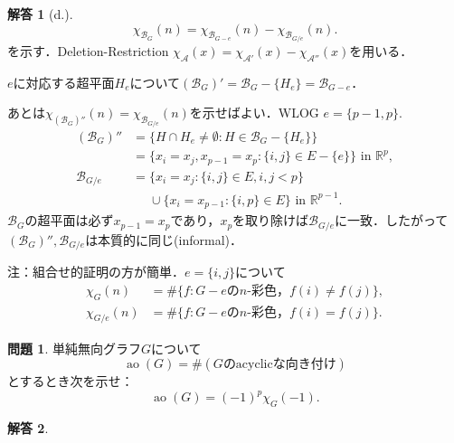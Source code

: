 \documentclass[xelatex,ja=standard,a4paper,14pt,everyparhook=compat]{bxjsarticle}
\DeclareMathOperator{\ao}{ao}
\newcommand{\bbR}{\mathbb{R}}
\newcommand{\mcA}{\mathcal{A}}
\newcommand{\mcB}{\mathcal{B}}
\theoremstyle{definition}
\newtheorem{problem}{問題}
\newtheorem*{answer}{解答}
\begin{document}
\begin{answer}[d.]
    \begin{equation*}
        \chi_{\mcB_G}(n) = \chi_{\mcB_{G-e}}(n) - \chi_{\mcB_{G/e}}(n).
    \end{equation*}
    を示す．Deletion-Restriction $\chi_{\mcA}(x) = \chi_{\mcA'}(x) - \chi_{\mcA''}(x)$を用いる．

    $e$に対応する超平面$H_e$について$(\mcB_G)' = \mcB_G - \{H_e\} = \mcB_{G-e}$．

    あとは$\chi_{(\mcB_G)''}(n) = \chi_{\mcB_{G/e}}(n)$を示せばよい．WLOG $e=\{p-1,p\}$. \begin{align*}
        (\mcB_G)'' &= \{H \cap H_e \neq \emptyset : H \in \mcB_G - \{H_e\}\} \\
            &= \{x_i = x_j, x_{p-1} = x_p : \{i,j\} \in E - \{e\}\}\text{ in $\bbR^p$}, \\
        \mcB_{G/e} &= \{x_i=x_j : \{i,j\} \in E, i,j < p\} \\
        &\phantom{{}={}}\cup \{x_i=x_{p-1} : \{i,p\} \in E\}\text{ in $\bbR^{p-1}$}.
    \end{align*}
    $\mcB_G$の超平面は必ず$x_{p-1} = x_p$であり，$x_p$を取り除けば$\mcB_{G/e}$に一致．したがって$(\mcB_G)'',\mcB_{G/e}$は本質的に同じ(informal)．

    注：組合せ的証明の方が簡単．$e=\{i,j\}$について \begin{align*}
        \chi_G(n) &= \#\{f : \text{$G-e$の$n$-彩色，$f(i) \neq f(j)$}\}, \\
        \chi_{G/e}(n) &= \#\{f : \text{$G-e$の$n$-彩色，$f(i) = f(j)$}\}.
    \end{align*}
\end{answer}

\begin{problem}
    単純無向グラフ$G$について \begin{equation*}
        \ao(G) = \#(\text{$G$のacyclicな向き付け})
    \end{equation*}
    とするとき次を示せ： \begin{equation*}
        \ao(G) = (-1)^p \chi_G(-1).
    \end{equation*}
\end{problem}
\begin{answer}

\end{answer}
\end{document}
